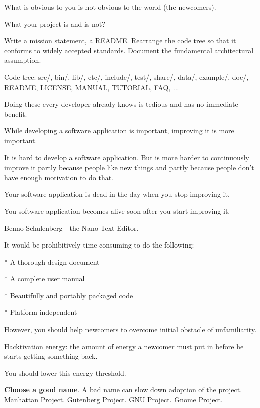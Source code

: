 \documentclass[landscape,30pt]{foils}
\begin{document}
What is obvious to you is not obvious to the world (the newcomers).

What your project is and is not?

Write a mission statement, a README.  Rearrange the code tree so that it conforms to widely accepted standards.  Document the  fundamental architectural assumption.

Code tree: src/, bin/, lib/, etc/, include/, test/, share/, data/, example/, doc/, README, LICENSE, MANUAL, TUTORIAL, FAQ, ...

Doing these every developer already knows is tedious and has no immediate benefit.



While developing a software application is important, improving it is
more important.

It is hard to develop a software application. But is more harder to
continuously improve it partly because people like new things and
partly because people don't have enough motivation to do that.

Your software application is dead in the day when you stop improving
it.

You software application becomes alive soon after you start improving
it.

Benno Schulenberg - the Nano Text Editor.



It would be prohibitively time-consuming to do the following:

* A thorough design document

* A complete user manual

* Beautifully and portably packaged code

* Platform independent

However, you should help newcomers to overcome initial obstacle of unfamiliarity.

\underline{Hacktivation energy}: the amount of energy a newcomer must put in before he starts getting something back.

You should lower this energy threshold.


{\bf Choose a good name}.   A bad name can slow down adoption of the project.  Manhattan Project. Gutenberg Project. GNU Project. Gnome Project.
\end{document}
